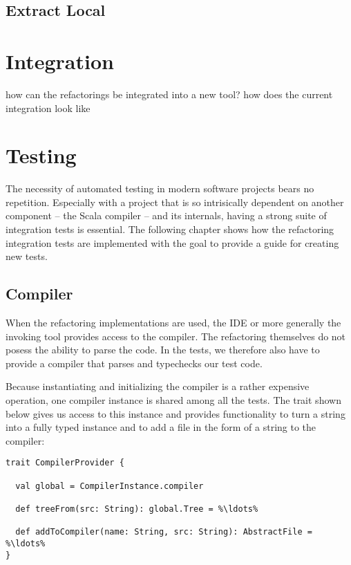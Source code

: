 \documentclass[10pt,a4paper,oneside]{scrreprt}
\begin{document}
\section{Extract Local}


\chapter{Integration}

how can the refactorings be integrated into a new tool?
how does the current integration look like

\chapter{Testing}

The necessity of automated testing in modern software projects bears no repetition. Especially with a project that is so intrisically dependent on another component -- the Scala compiler -- and its internals, having a strong suite of integration tests is essential. The following chapter shows how the refactoring integration tests are implemented with the goal to provide a guide for creating new tests.

\section{Compiler}

When the refactoring implementations are used, the IDE or more generally the invoking tool provides access to the compiler. The refactoring themselves do not posess the ability to parse the code. In the tests, we therefore also have to provide a compiler that parses and typechecks our test code.

Because instantiating and initializing the compiler is a rather expensive operation, one compiler instance is shared among all the tests. The  trait shown below gives us access to this instance and provides functionality to turn a string into a fully typed  instance and to add a file in the form of a string to the compiler:

\begin{lstlisting}
trait CompilerProvider {

  val global = CompilerInstance.compiler
    
  def treeFrom(src: String): global.Tree = %\ldots%
  
  def addToCompiler(name: String, src: String): AbstractFile = %\ldots%
}
\end{lstlisting}
\end{document}
